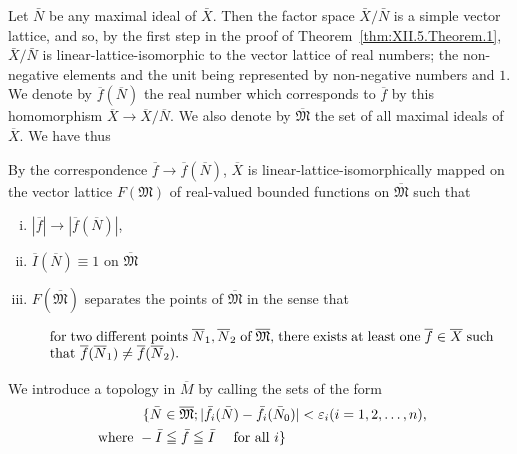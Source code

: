 Let $\bar{N}$ be any maximal ideal of $\bar{X}$. Then the factor space $\bar{X}/\bar{N}$ is a simple vector lattice, and so, by the first step in the proof of Theorem~\ref{thm:XII.5.Theorem.1}, $\bar{X}/\bar{N}$ is linear-lattice-isomorphic to the vector lattice of real numbers; the non-negative elements and the unit being represented by non-negative numbers and $1$. We denote by $\overline{f}(\overline{N})$ the real number which corresponds to $\overline{f}$ by this homomorphism $\overline{X} \to \overline{X}/\overline{N}$. We also denote by $\overline{\mathfrak{M}}$ the set of all maximal ideals of $\overline{X}$. We have thus 

\begin{theorem}\label{thm:XII.5.Theorem.2} By the correspondence $\overline{f} \to \overline{f}(\overline{N})$, $\overline{X}$ is linear-lattice-isomorphically mapped on the vector lattice $F(\mathfrak{M})$ of real-valued bounded functions on $\overline{\mathfrak{M}}$ such that \begin{enumerate}[(i)]
\item $|\overline{f}| \to |\overline{f}(\overline{N})|$,
\item $\overline{I}(\overline{N}) \equiv 1$ on $\overline{\mathfrak{M}}$
\item $F(\overline{\mathfrak{M}})$ separates the points of $\overline{\mathfrak{M}}$ in the sense that 

\begin{equation}\label{eq:XII.5.6}
\begin{minipage}[b]{0.92\linewidth}
for two different points $\overline{N}_1, \overline{N}_2$ of $\overline{\mathfrak{M}}$, there exists at least one $\overline{f} \in \overline{X}$ such that $\overline{f}(\overline{N}_1) \neq \overline{f}(\overline{N}_2)$.
\end{minipage}
\end{equation}
\end{enumerate}
\end{theorem}


\begin{remarku} We introduce a topology in $\overline{M}$ by calling the sets of the form 
\begin{align}
\{\bar {N}& \in \overline {{\mathfrak {M}}}; | \bar {f} _{i} (\bar {N}) - \bar {f} _{i} (\bar {N} _{0}) | < \varepsilon_{i} (i = 1, 2, \dots , n), \notag \\
\text{ where } - \bar {I}& \leqq \bar {f} \leqq \bar {I} \quad \text{ for all } i \} \notag
\end{align}
\end{remarku}

